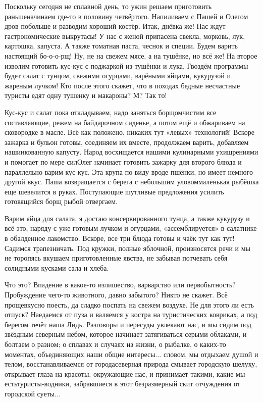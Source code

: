 Поскольку сегодня не сплавной день, то ужин решаем приготовить раньше\mdash начинаем где-то в половину четвёртого. Напиливаем с Пашей и Олегом дров побольше и разводим хороший костёр. Итак, днёвка же! Нас ждут гастрономические выкрутасы! У нас с женой припасена свекла, морковь, лук, картошка, капуста. А также томатная паста, чеснок и специи. Будем варить настоящий бо-о-о-рщ! Ну, не на свежем мясе, а на тушёнке, но всё же! На второе изволим готовить кус-кус с поджаркой из тушёнки и лука. Гвоздём программы будет салат с тунцом, свежими огурцами, варёными яйцами, кукурузой и жареным лучком! Кто после этого скажет, что в походах бедные несчастные туристы едят одну тушенку и макароны? М? Так то!

Кус-кус и салат пока откладываем, надо заняться борщом\mdash чистим все составляющие, режем на байдарочном сиденье, а потом ещё и обжариваем на сковородке в масле. Всё как положено, никаких тут «левых» технологий! Вскоре зажарка и бульон готовы, соединяем их вместе, продолжаем варить, добавляем нашинкованную капусту. Народ восхищается нашими кулинарными ухищрениями и помогает по мере сил\mdash Олег начинает готовить зажарку для второго блюда и параллельно варим кус-кус. Эта крупа по виду вроде пшёнки, но имеет немного другой вкус. Паша возвращается с берега с небольшим уловом\mdash маленькая рыбёшка еще шевелится в руках. Поступающие шутливые предложения усилить готовящийся борщ рыбой отвергаем. 

Варим яйца для салата, я достаю консервированного тунца, а также кукурузу и всё это, наряду с уже готовым лучком и огурцами, «ассемблируется» в салатнике в обалденное лакомство. Вскоре, все три блюда готовы и чаёк тут как тут! Садимся трапезничать. Под кружки, полные яблочной, произносятся речи и мы не торопясь вкушаем приготовленные явства, не забывая потчевать себя солидными кусками сала и хлеба. 

Что это? Впадение в какое-то излишество, варварство или первобытность? Пробуждение чего-то животного, давно забытого? Никто не скажет. Всё проще\mdash вкусно поесть, да сладко поспать на свежем воздухе. Не для этого ли есть отпуск? Наедаемся от пуза и валяемся у костра на туристических ковриках, а под берегом течёт наша Лидь. Разговоры и пересуды увлекают нас, и мы сидим под звёздным северным небом, которое начинает затягиваться серыми облаками, и болтаем о разном; о сплавах и случаях из жизни, о рыбалке, о каких-то моментах, объединяющих наши общие интересы$\ldots$ словом, мы отдыхаем душой и телом, восстанавливаемся от города\mdash северная природа смывает городскую шелуху, открывает глаза на красоты, окружающие нас, и принимает такими, какие мы есть\mdash туристы-водники, забравшиеся в этот безразмерный скит отчуждения от городской суеты$\ldots$ 

\begin{center}
\end{center}
